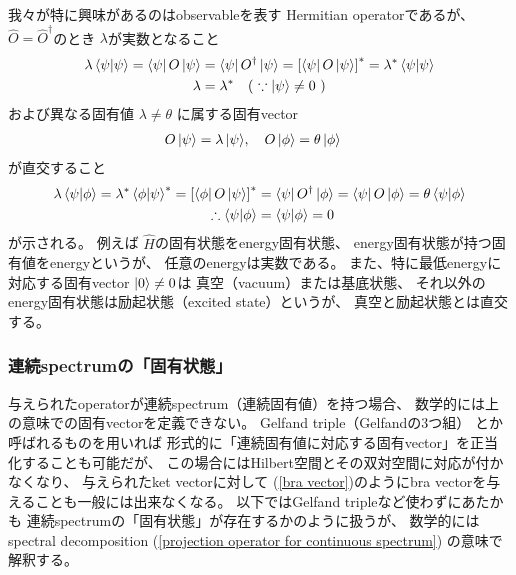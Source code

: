 我々が特に興味があるのはobservableを表す
Hermitian operatorであるが、
$\hat{O} = \hat{O}^\dagger$のとき
$\lambda$が実数となること
\begin{align}
    \lambda \braket{\psi | \psi}
    =
    \bra{\psi} \hat{O} \ket{\psi}
    &= \bra{\psi} \hat{O}^\dagger \ket{\psi}
    = \left[ \bra{\psi} \hat{O} \ket{\psi}\right]^*
    = \lambda^* \braket{\psi | \psi}
\notag\\
    \lambda &= \lambda^*
    \quad
    (\ 
        \because
        \ket{\psi} \neq 0
    \ 
    )
\end{align}
および異なる固有値
$\lambda \neq \theta$
に属する固有vector
\begin{align}
    O \ket{\psi} = \lambda \ket{\psi}
&,\quad
    O \ket{\phi} = \theta \ket{\phi}
\end{align}
が直交すること
\begin{align}
    \lambda
    \braket{\psi|\phi}
    =
    \lambda^*
    \braket{\phi|\psi}^*
    =
    \left[
        \bra{\phi} O \ket{\psi}
    \right]^*
    &= \bra{\psi} O^\dagger \ket{\phi}
    = \bra{\psi} O \ket{\phi}
    = \theta \braket{\psi|\phi}
\\\therefore
    \braket{\psi|\phi}
    &=\braket{\psi|\phi}
    =0
\label{physically distinct states}
\end{align}
が示される。
例えば
$\hat{H}$の固有状態をenergy固有状態、
energy固有状態が持つ固有値をenergyというが、
任意のenergyは実数である。
また、特に最低energyに対応する固有vector
$\ket{0} \neq 0$は
真空（vacuum）または基底状態、
それ以外のenergy固有状態は励起状態（excited state）というが、
真空と励起状態とは直交する。

\subsubsection{連続spectrumの「固有状態」}

与えられたoperatorが連続spectrum（連続固有値）を持つ場合、
数学的には上の意味での固有vectorを定義できない。
Gelfand triple（Gelfandの$3$つ組）
とか呼ばれるものを用いれば
形式的に「連続固有値に対応する固有vector」を正当化することも可能だが、
この場合にはHilbert空間とその双対空間に対応が付かなくなり、
与えられたket vectorに対して
(\ref{bra vector})のようにbra vectorを与えることも一般には出来なくなる。
以下ではGelfand tripleなど使わずにあたかも
連続spectrumの「固有状態」が存在するかのように扱うが、
数学的にはspectral decomposition
(\ref{projection operator for continuous spectrum})
の意味で解釈する。

